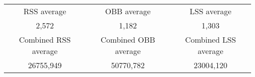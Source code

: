 \begin{tabular}{c|c|c}\\ 
RSS average & OBB average & LSS average\\ 
2,572 & 1,182 & 1,303\\ 
\hline 
Combined RSS average & Combined OBB average & Combined LSS average\\ 
26755,949 & 50770,782 & 23004,120\\ 
\end{tabular}